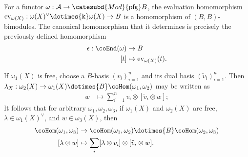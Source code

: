 
For a functor $\omega: \mathcal{A} \to \catesubd{Mod}{\mathrm{pfg}}B$, the evaluation homomorphism $\mathrm{ev}_{\omega(X)}: \omega(X)^\vee \dotimes{\Bbbk} \omega(X) \to B$ is a homomorphism of $(B, B)$-bimodules. The canonical homomorphism that it determines is precisely the previously defined homomorphism
\begin{equation}\label{eqn:L-counit}
	\begin{aligned}
		\epsilon: \coEnd(\omega) & \to B \\
		[t] & \mapsto \mathrm{ev}_{\omega(X)}(t).
	\end{aligned}
\end{equation}

If $\omega_1(X)$ is free, choose a $B$-basis $(v_i)_{i=1}^n$ and its dual basis $(\check{v}_i)_{i=1}^n$. Then $\lambda_X: \omega_2(X) \to \omega_1(X) \dotimes{B} \coHom(\omega_1, \omega_2)$ may be written as
\begin{equation}\label{eqn:L-coaction}\begin{aligned}
	w & \mapsto \sum_{i=1}^n v_i \otimes [\check{v}_i \otimes w];
\end{aligned}\end{equation}
It follows that for arbitrary $\omega_1, \omega_2, \omega_3$, if $\omega_1(X)$ and $\omega_2(X)$ are free, $\lambda \in \omega_1(X)^\vee$, and $w \in \omega_3(X)$, then
\begin{equation}\label{eqn:L-comult}\begin{aligned}
	\coHom(\omega_1, \omega_3) & \to \coHom(\omega_1, \omega_2) \dotimes{B} \coHom(\omega_2, \omega_3) \\
	[\lambda \otimes w] & \mapsto \sum_i [\lambda \otimes v_i] \otimes [\check{v}_i \otimes w].
\end{aligned}\end{equation}

